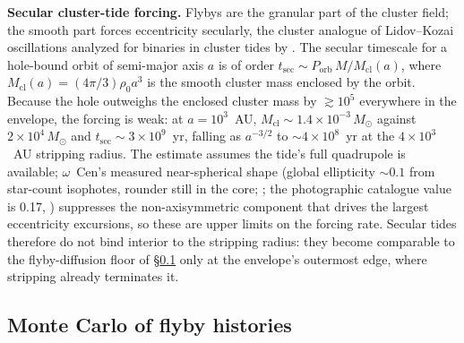 \documentclass[11pt]{article}
\newcommand{\msun}{\ensuremath{M_\odot}}
\newcommand{\ocen}{\ensuremath{\omega}~Cen}
\begin{document}
\textbf{Secular cluster-tide forcing.} Flybys are the granular part of the cluster field; the smooth part forces eccentricity secularly, the cluster analogue of Lidov--Kozai oscillations analyzed for binaries in cluster tides by \citet{HamiltonRafikov2019}. The secular timescale for a hole-bound orbit of semi-major axis $a$ is of order $t_{\mathrm{sec}} \sim P_{\mathrm{orb}}\,M/M_{\mathrm{cl}}(a)$, where $M_{\mathrm{cl}}(a) = (4\pi/3)\rho_{0}a^{3}$ is the smooth cluster mass enclosed by the orbit. Because the hole outweighs the enclosed cluster mass by $\gtrsim 10^{5}$ everywhere in the envelope, the forcing is weak: at $a = 10^{3}$~AU, $M_{\mathrm{cl}} \sim 1.4\times10^{-3}\,\msun$ against $2\times10^{4}\,\msun$ and $t_{\mathrm{sec}} \sim 3\times10^{9}$~yr, falling as $a^{-3/2}$ to $\sim 4\times10^{8}$~yr at the $4\times10^{3}$~AU stripping radius. The estimate assumes the tide's full quadrupole is available; \ocen's measured near-spherical shape (global ellipticity $\sim 0.1$ from star-count isophotes, rounder still in the core; \citealt{Geyer1983,Pancino2003}; the photographic catalogue value is 0.17, \citealt{WhiteShawl1987}) suppresses the non-axisymmetric component that drives the largest eccentricity excursions, so these are upper limits on the forcing rate. Secular tides therefore do not bind interior to the stripping radius: they become comparable to the flyby-diffusion floor of \S\ref{sec:mc} only at the envelope's outermost edge, where stripping already terminates it.

\subsection{Monte Carlo of flyby histories}
\label{sec:mc}
\end{document}
